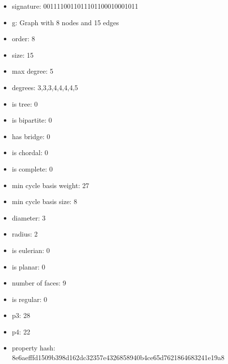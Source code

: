 \begin{itemize}
\item signature: 0011110011011101100010001011
\item g: Graph with 8 nodes and 15 edges
\item order: 8
\item size: 15
\item max degree: 5
\item degrees: 3,3,3,4,4,4,4,5
\item is tree: 0
\item is bipartite: 0
\item has bridge: 0
\item is chordal: 0
\item is complete: 0
\item min cycle basis weight: 27
\item min cycle basis size: 8
\item diameter: 3
\item radius: 2
\item is eulerian: 0
\item is planar: 0
\item number of faces: 9
\item is regular: 0
\item p3: 28
\item p4: 22
\item property hash: 8e6aefffd1509b398d162dc32357e4326858940b4ce65d7621864683241e19a8
\end{itemize}
\newpage
\begin{figure}
\end{figure}
